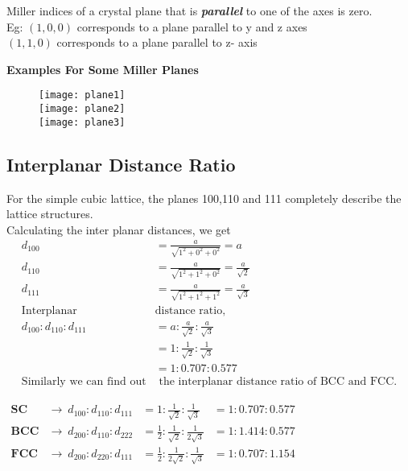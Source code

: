 \begin{note}
	Miller indices of a crystal plane that is \textbf{\textit{parallel}} to one of the axes is zero.\\
	Eg: $(1, 0, 0)$ corresponds to a plane parallel to y and z axes\\
	$(1, 1, 0)$ corresponds to a plane parallel to z- axis
\end{note}
\textbf{Examples For Some Miller Planes}

\begin{center}
	\begin{figure}[H]
		\texttt{[image: plane1]}\\
		\texttt{[image: plane2]}\\
		\texttt{[image: plane3]}
	\end{figure}
\end{center}

\newpage
\subsection {Interplanar Distance Ratio}
For the simple cubic lattice, the planes 100,110 and 111 completely describe the lattice structures.\\
Calculating the inter planar distances, we get
\begin{align*}
d_{100}&= \frac{a}{\sqrt{1^{2}+0^{2}+0^{2}}}= a\\
d_{110}&= \frac{a}{\sqrt{1^{2}+1^{2}+0^{2}}}= \frac{a}{\sqrt{2}}\\
d_{111}&= \frac{a}{\sqrt{1^{2}+1^{2}+1^{2}}}= \frac{a}{\sqrt{3}}\\
\text {Interplanar }&\text{distance ratio,}\\
d_{100}: d_{110}: d_{111} &= a: \frac{a}{\sqrt{2}}: \frac{a}{\sqrt{3}}\\
&= 1: \frac{1}{\sqrt{2}}: \frac{1}{\sqrt{3}}\\
&= 1: 0.707: 0.577\\
\text{Similarly we can find out}&\text{ the interplanar distance ratio of BCC and FCC.}
\end{align*}
\begin{eBox}
	$\begin{aligned}
	\textbf{SC} &\longrightarrow \ d_{100}: d_{110}: d_{111} &= 1: \frac{1}{\sqrt{2}}: \frac{1}{\sqrt{3}} &= 1: 0.707: 0.577\\
	\textbf{BCC} &\longrightarrow \ d_{200}: d_{110}: d_{222} &= \frac{1}{2}: \frac{1}{\sqrt{2}}: \frac{1}{2 \sqrt{3}} &= 1: 1.414: 0.577\\
	\textbf{FCC} &\longrightarrow \ d_{200}: d_{220}: d_{111} &= \frac{1}{2}: \frac{1}{2 \sqrt{2}}: \frac{1}{\sqrt{3}} &= 1: 0.707: 1.154
	\end{aligned}$
\end{eBox}
